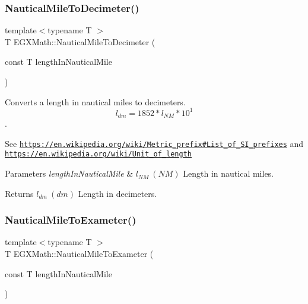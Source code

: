 \subsubsection{\texorpdfstring{Nautical\+Mile\+To\+Decimeter()}{NauticalMileToDecimeter()}}
{\footnotesize\ttfamily template$<$typename T $>$ \\
T E\+G\+X\+Math\+::\+Nautical\+Mile\+To\+Decimeter (\begin{DoxyParamCaption}\item[{const T}]{length\+In\+Nautical\+Mile }\end{DoxyParamCaption})}



Converts a length in nautical miles to decimeters. \[ l_{dm}=1852 * l_{NM} * 10^{1} \]. 

See \href{https://en.wikipedia.org/wiki/Metric_prefix#List_of_SI_prefixes}{\tt https\+://en.\+wikipedia.\+org/wiki/\+Metric\+\_\+prefix\#\+List\+\_\+of\+\_\+\+S\+I\+\_\+prefixes} and \href{https://en.wikipedia.org/wiki/Unit_of_length}{\tt https\+://en.\+wikipedia.\+org/wiki/\+Unit\+\_\+of\+\_\+length} 
\begin{DoxyParams}{Parameters}
{\em length\+In\+Nautical\+Mile} & $ l_{NM}\ (NM)$ Length in nautical miles. \\
\hline
\end{DoxyParams}
\begin{DoxyReturn}{Returns}
$ l_{dm}\ (dm)$ Length in decimeters. 
\end{DoxyReturn}
\mbox{\label{group___e_g_x_math-_conversions-_length_conversions-_non-_s_i-_nautical_mile-_s_i_ga1b24e221d09b49c54d546eb1124e9894}} 
\subsubsection{\texorpdfstring{Nautical\+Mile\+To\+Exameter()}{NauticalMileToExameter()}}
{\footnotesize\ttfamily template$<$typename T $>$ \\
T E\+G\+X\+Math\+::\+Nautical\+Mile\+To\+Exameter (\begin{DoxyParamCaption}\item[{const T}]{length\+In\+Nautical\+Mile }\end{DoxyParamCaption})}



